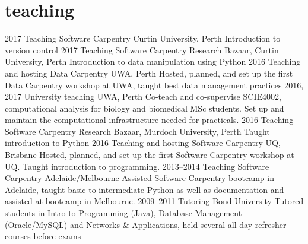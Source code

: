 \documentclass[]{friggeri-cv} %
\begin{document}

\section{teaching}

\begin{entrylist}
\entry
{2017}
{Teaching Software Carpentry}
{Curtin University, Perth}
{Introduction to version control}
\entry
{2017}
{Teaching Software Carpentry}
{Research Bazaar, Curtin University, Perth}
{Introduction to data manipulation using Python}
\entry
{2016}
{Teaching and hosting Data Carpentry}
{UWA, Perth}
{Hosted, planned, and set up the first Data Carpentry workshop at UWA, taught best data management practices}
\entry
{2016, 2017}
{University teaching}
{UWA, Perth}
{Co-teach and co-supervise SCIE4002, computational analysis for biology and biomedical MSc students. Set up and maintain the computational infrastructure needed for practicals.}
\entry
{2016}
{Teaching Software Carpentry}
{Research Bazaar, Murdoch University, Perth}
{Taught introduction to Python}
\entry
{2016}
{Teaching and hosting Software Carpentry}
{UQ, Brisbane}
{Hosted, planned, and set up the first Software Carpentry workshop at UQ. Taught introduction to programming.}
\entry
{2013--2014}
{Teaching Software Carpentry}
{Adelaide/Melbourne}
{Assisted Software Carpentry bootcamp in Adelaide, taught basic to intermediate Python as well as documentation and assisted at bootcamp in Melbourne.}
\entry
{2009--2011}
{Tutoring}
{Bond University}
{Tutored students in Intro to Programming (Java), Database Management (Oracle/MySQL) and Networks \& Applications, held several all-day refresher courses before exams}
\end{entrylist}
\end{document}

